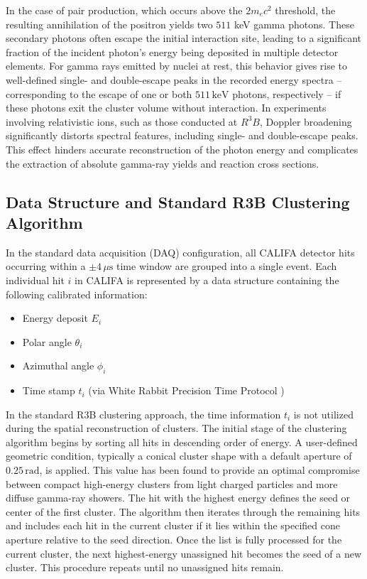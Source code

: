 \documentclass[final,5p,times,twocolumn]{elsarticle}
\begin{document}
In the case of pair production, which occurs above the $2m_ec^2$ threshold, the resulting annihilation of the positron yields two $511$ keV gamma photons. These secondary photons often escape the initial interaction site, leading to a significant fraction of the incident photon’s energy being deposited in multiple detector elements.\newline
For gamma rays emitted by nuclei at rest, this behavior gives rise to well-defined single- and double-escape peaks in the recorded energy spectra -- corresponding to the escape of one or both $511\,\mathrm{keV}$ photons, respectively -- if these photons exit the cluster volume without interaction.\newline
In experiments involving relativistic ions, such as those conducted at $R^3B$, Doppler broadening significantly distorts spectral features, including single- and double-escape peaks. This effect hinders accurate reconstruction of the photon energy and complicates the extraction of absolute gamma-ray yields and reaction cross sections.

\subsection{Data Structure and Standard R3B Clustering Algorithm}\label{s_sec:r3b_clustering}
In the standard data acquisition (DAQ) configuration, all CALIFA detector hits occurring within a $\pm 4\,\mu\mathrm{s}$ time window are grouped into a single event. Each individual hit $i$ in CALIFA is represented by a data structure containing the following calibrated information:
\begin{itemize}
    \item Energy deposit $E_i$
    \item Polar angle $\theta_i$
    \item Azimuthal angle $\phi_i$
    \item Time stamp $t_i$ (via White Rabbit  Precision Time Protocol \cite{lipinski2011white})
\end{itemize}
In the standard R3B clustering approach, the time information $t_i$ is not utilized during the spatial reconstruction of clusters.\newline
The initial stage of the clustering algorithm begins by sorting all hits in descending order of energy. A user-defined geometric condition, typically a conical cluster shape with a default aperture of $0.25\,\mathrm{rad}$, is applied. This value has been found to provide an optimal compromise between compact high-energy clusters from light charged particles and more diffuse gamma-ray showers.\newline
The hit with the highest energy defines the seed or center of the first cluster. The algorithm then iterates through the remaining hits and includes each hit in the current cluster if it lies within the specified cone aperture relative to the seed direction. Once the list is fully processed for the current cluster, the next highest-energy unassigned hit becomes the seed of a new cluster. This procedure repeats until no unassigned hits remain.\newline
\end{document}
